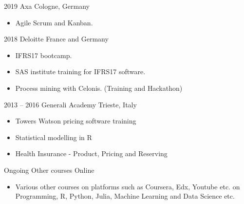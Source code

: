 \documentclass[
	a4paper,
]{fortysecondscv}
\begin{document}
		\begin{cvtable}[1.5]
			\cvitem
				{2019}
				{Axa}
				{Cologne, Germany}
				{
					\vspace{-\topsep}
					\begin{itemize}[nosep, leftmargin=0pt, label={}]
						\item Agile Scrum and Kanban.
					\end{itemize}
				}
			\cvitem
				{2018}
				{Deloitte}
				{France and Germany}
				{
					\vspace{-\topsep}
					\begin{itemize}[nosep, leftmargin=0pt, label={}]
						\item IFRS17 bootcamp.
						\item SAS institute training for IFRS17 software.
						\item Process mining with Celonis. (Training and Hackathon)
					\end{itemize}
				}
			\cvitem
				{2013 -- 2016}
				{Generali Academy}
				{Trieste, Italy}
				{
					\vspace{-\topsep}
					\begin{itemize}[nosep, leftmargin=0pt, label={}]
						\item Towers Watson pricing software training
						\item Statistical modelling in R
						\item Health Insurance - Product, Pricing and Reserving
					\end{itemize}
				}
			\cvitem
				{Ongoing}
				{Other courses}
				{Online}
				{
					\vspace{-\topsep}
					\begin{itemize}[nosep, leftmargin=0pt, label={}]
						\item Various other courses on platforms such as Coursera, Edx, Youtube etc. on Programming, R, Python, Julia, Machine Learning and Data Science etc.
					\end{itemize}
				}
		\end{cvtable}

	\begin{cvtable}
	\end{cvtable}
\end{document}
